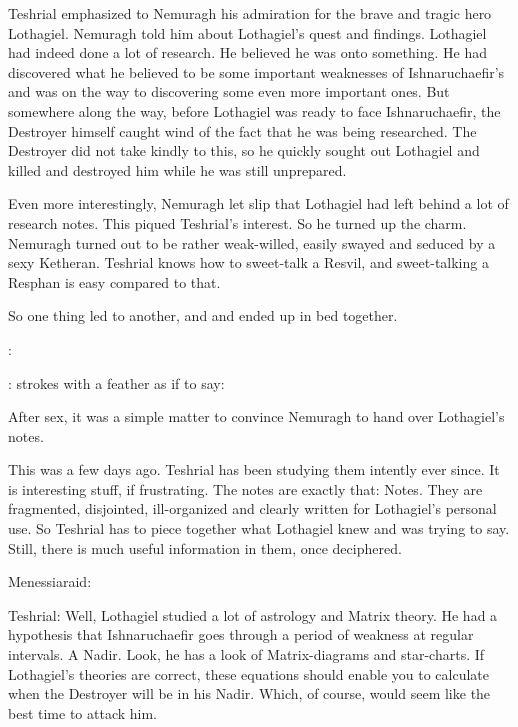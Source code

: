 Teshrial emphasized to Nemuragh his admiration for the brave and tragic hero Lothagiel. 
Nemuragh told him about Lothagiel's quest and findings. 
Lothagiel had indeed done a lot of research. 
He believed he was onto something. 
He had discovered what he believed to be some important weaknesses of Ishnaruchaefir's and was on the way to discovering some even more important ones. 
But somewhere along the way, before Lothagiel was ready to face Ishnaruchaefir, the Destroyer himself caught wind of the fact that he was being researched. 
The Destroyer did not take kindly to this, so he quickly sought out Lothagiel and killed and destroyed him while he was still unprepared. 

Even more interestingly, Nemuragh let slip that Lothagiel had left behind a lot of research notes. 
This piqued Teshrial's interest. 
So he turned up the charm. 
Nemuragh turned out to be rather weak-willed, easily swayed and seduced by a sexy Ketheran. 
Teshrial knows how to sweet-talk a Resvil, and sweet-talking a Resphan is easy compared to that. 

So one thing led to another, and \Teshrial and \Nemuragh ended up in bed together. 

\Menessiaraid: 

\Teshrial: 
\Teshrial strokes \Menessiaraid with a feather as if to say: 

After sex, it was a simple matter to convince Nemuragh to hand over Lothagiel's notes. 

This was a few days ago. 
Teshrial has been studying them intently ever since. 
It is interesting stuff, if frustrating. 
The notes are exactly that: Notes. 
They are fragmented, disjointed, ill-organized and clearly written for Lothagiel's personal use. 
So Teshrial has to piece together what Lothagiel knew and was trying to say. 
Still, there is much useful information in them, once deciphered. 

Menessiaraid: 

Teshrial:
Well, Lothagiel studied a lot of astrology and Matrix theory. 
He had a hypothesis that Ishnaruchaefir goes through a period of weakness at regular intervals. 
A Nadir. 
Look, he has a look of Matrix-diagrams and star-charts. 
If Lothagiel's theories are correct, these equations should enable you to calculate when the Destroyer will be in his Nadir. 
Which, of course, would seem like the best time to attack him. 

